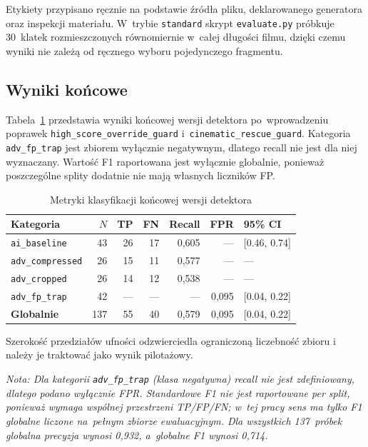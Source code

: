 Etykiety przypisano ręcznie na podstawie źródła pliku, deklarowanego generatora
oraz inspekcji materiału. W~trybie \texttt{standard} skrypt \texttt{evaluate.py}
próbkuje 30~klatek rozmieszczonych równomiernie w~całej długości filmu, dzięki
czemu wyniki nie zależą od ręcznego wyboru pojedynczego fragmentu.

\subsection*{Wyniki końcowe}

Tabela~\ref{tab:eval_results} przedstawia wyniki końcowej wersji detektora
po~wprowadzeniu poprawek \texttt{high\_score\_override\_guard}
i~\texttt{cinematic\_rescue\_guard}. Kategoria \texttt{adv\_fp\_trap}
jest zbiorem wyłącznie negatywnym, dlatego recall nie jest dla niej wyznaczany.
Wartość F1 raportowana jest wyłącznie globalnie, ponieważ poszczególne splity
dodatnie nie mają własnych liczników FP.

\begin{table}[h]
\centering
\caption{Metryki klasyfikacji końcowej wersji detektora}
\label{tab:eval_results}
\begin{tabular}{lrrrrrl}
\toprule
Kategoria & $N$ & TP & FN & Recall & FPR & 95\% CI \\
\midrule
\texttt{ai\_baseline}    & 43  & 26 & 17 & 0{,}605 & ---     & [0.46, 0.74] \\
\texttt{adv\_compressed} & 26  & 15 & 11 & 0{,}577 & ---     & --- \\
\texttt{adv\_cropped}    & 26  & 14 & 12 & 0{,}538 & ---     & --- \\
\texttt{adv\_fp\_trap}   & 42  & --- & --- & ---     & 0{,}095 & [0.04, 0.22] \\
\textbf{Globalnie}       & 137 & 55 & 40 & 0{,}579 & 0{,}095 & [0.04, 0.22] \\
\bottomrule
\end{tabular}
\end{table}

Szerokość przedziałów ufności odzwierciedla ograniczoną liczebność zbioru
i należy je traktować jako wynik pilotażowy.

\noindent\textit{Nota: Dla kategorii \texttt{adv\_fp\_trap} (klasa negatywna)
recall nie jest zdefiniowany, dlatego podano wyłącznie FPR. Standardowe F1
nie jest raportowane per split, ponieważ wymaga wspólnej przestrzeni TP/FP/FN;
w~tej pracy sens ma tylko F1 globalne liczone na~pełnym zbiorze ewaluacyjnym.
Dla wszystkich 137~próbek globalna precyzja wynosi 0{,}932, a~globalne
F1 wynosi 0{,}714.}

